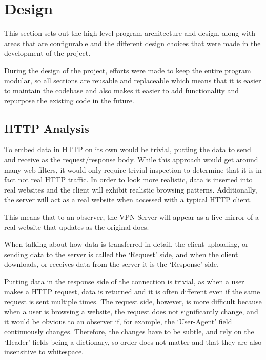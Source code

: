 \section{Design}
This section sets out the high-level program architecture and design, along with areas that are configurable and the different design choices that were made in the development of the project.

During the design of the project, efforts were made to keep the entire program modular, so all sections are reusable and replaceable which means that it is easier to maintain the codebase and also makes it easier to add functionality and repurpose the existing code in the future.
\subsection{HTTP Analysis}
To embed data in HTTP on its own would be trivial, putting the data to send and receive as the request/response body. While this approach would get around many web filters, it would only require trivial inspection to determine that it is in fact not real HTTP traffic.
In order to look more realistic, data is inserted into real websites and the client will exhibit realistic browsing patterns. Additionally, the server will act as a real website when accessed with a typical HTTP client.

This means that to an observer, the VPN-Server will appear as a live mirror of a real website that updates as the original does.

When talking about how data is transferred in detail, the client uploading, or sending data to the server is called the `Request' side, and when the client downloads, or receives data from the server it is the `Response' side.

Putting data in the response side of the connection is trivial, as when a user makes a HTTP request, data is returned and it is often different even if the same request is sent multiple times.
The request side, however, is more difficult because when a user is browsing a website, the request does not significantly change, and it would be obvious to an observer if, for example, the `User-Agent' field continuously changes. Therefore, the changes have to be subtle, and rely on the `Header' fields being a dictionary, so order does not matter and that they are also insensitive to whitespace.

\newpage
